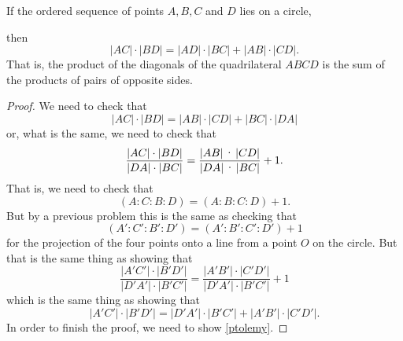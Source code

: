 \documentclass[newpage,hints,handout]{ximera}
\begin{document}
\begin{theorem}[Ptolemy] If the ordered sequence of points $A,B,C$ and $D$ lies on a circle,
\begin{image}
\end{image}
then%
\[
\left\vert AC\right\vert \cdot\left\vert BD\right\vert
=\left\vert AD\right\vert \cdot\left\vert BC\right\vert
+\left\vert AB\right\vert \cdot\left\vert CD\right\vert
.
\]
That is, the product of the diagonals of the quadrilateral $ABCD$ is the sum
of the products of pairs of opposite sides.
\end{theorem}

\begin{proof}
We need to check that%
\[
\left\vert AC\right\vert \cdot\left\vert BD\right\vert
=\left\vert AB\right\vert \cdot\left\vert CD\right\vert
+\left\vert BC\right\vert \cdot\left\vert DA\right\vert
\]
or, what is the same, we need to check that%
\[
\frac{\left\vert AC\right\vert \cdot\left\vert
BD\right\vert }{\left\vert DA\right\vert \cdot\left\vert
BC\right\vert }=\frac{\left\vert AB\right\vert \text{\textperiodcentered
}\left\vert CD\right\vert }{\left\vert DA\right\vert \text{\textperiodcentered
}\left\vert BC\right\vert }+1.
\]
That is, we need to check that
\[
\left(  A:C:B:D\right)  =\left(  A:B:C:D\right)+1  .
\]
But by a previous problem this is the same as checking that%
\[
\left(  A':C':B':D'\right)  =\left(A':B':C':D'\right)+1
\]
for the projection of the four points onto a line from a point $O$ on the
circle. But that is the same thing as showing that
\[
\frac{\left\vert A'C'\right\vert \cdot \left\vert B'D'\right\vert }{\left\vert D'A'\right\vert \cdot\left\vert B'C'\right\vert }=\frac{\left\vert A'B'\right\vert
\cdot\left\vert C'D'\right\vert
}{\left\vert D'A'\right\vert \cdot \left\vert B'C'\right\vert }+1%
\]
which is the same thing as showing that%
\begin{equation} \label{ptolemy}\tag{$*$}
\left\vert A'C'\right\vert \cdot \left\vert B'D'\right\vert =
\left\vert D'A'\right\vert \cdot \left\vert B'C'\right\vert 
+\left\vert A'B'\right\vert \cdot \left\vert C'D'\right\vert .
\end{equation}
In order to finish the proof, we need to show \eqref{ptolemy}.
\end{proof}
\end{document}
